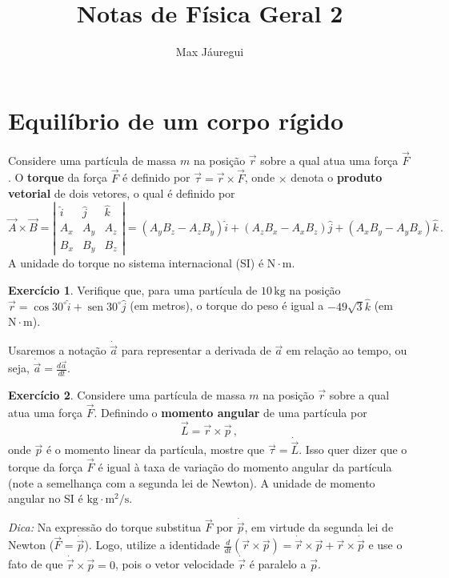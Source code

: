 \documentclass[12pt,a4paper]{article}
\title{Notas de Física Geral 2}
\author{Max Jáuregui}
\theoremstyle{definition}
\newtheorem{ex}{Exercício}[section]
\DeclareMathOperator{\sen}{sen}
\begin{document}
\maketitle
\tableofcontents

\section{Equilíbrio de um corpo rí\-gi\-do}

Considere uma partícula de massa $m$ na posição $\vec r$ sobre a qual
atua uma força $\vec F$. O \textbf{torque} da força $\vec F$ é definido
por $\vec\tau=\vec r\times\vec F$, onde $\times$ denota o
\textbf{produto vetorial} de dois vetores, o qual é definido por
$$\vec A\times\vec B= \left|
      \begin{array}{ccc}
        \hat i&\hat j&\hat k\\
        A_x&A_y&A_z\\
        B_x&B_y&B_z
      \end{array}
    \right|=(A_yB_z-A_zB_y)\hat i+(A_zB_x-A_xB_z)\hat j+(A_xB_y-A_yB_x)\hat k\,.$$
A unidade do torque no sistema internacional (SI) é
$\mathrm{N}\cdot\mathrm{m}$.

\begin{ex}
  Verifique que, para uma par\-tí\-cu\-la de $10\,\mathrm{kg}$ na posição
  $\vec r=\cos 30^\circ\hat i+\sen 30^\circ\hat j$ (em metros), o
  torque do peso é igual a $-49\sqrt{3}\hat k$ (em
  $\mathrm{N}\cdot \mathrm{m}$).
\end{ex}

Usaremos a notação $\dot{\vec a}$ para representar a derivada de
$\vec a$ em relação ao tempo, ou seja,
$\dot{\vec a}=\frac{d\vec a}{dt}$.

\begin{ex}
  Considere uma partícula de massa $m$ na posição $\vec r$ sobre a
  qual atua uma força $\vec F$. Definindo o \textbf{momento angular} de
  uma partícula por
  $$\vec L=\vec r\times\vec p\,,$$
   onde $\vec p$ é o  momento linear da partícula, mostre que $\vec\tau=\dot{\vec
    L}$. Isso quer dizer que o torque da força $\vec F$ é igual à taxa
  de variação do momento angular da partícula (note a semelhança com a
  segunda lei de Newton). A unidade de momento angular no SI é
  $\mathrm{kg}\cdot\mathrm{m^2/s}$.

  \noindent\textit{Dica:} Na expressão do torque substitua $\vec F$ por
  $\dot{\vec p}$, em virtude da segunda lei de Newton
  ($\vec F=\dot{\vec p}$). Logo, utilize a identidade
  $\frac{d}{dt}(\vec r\times\vec p)=\dot{\vec r}\times\vec p+\vec
  r\times\dot{\vec p}$ e use o fato de que
  $\dot{\vec r}\times\vec p=0$, pois o vetor velocidade $\dot{\vec r}$
  é paralelo a $\vec p$.
\end{ex}
\end{document}
